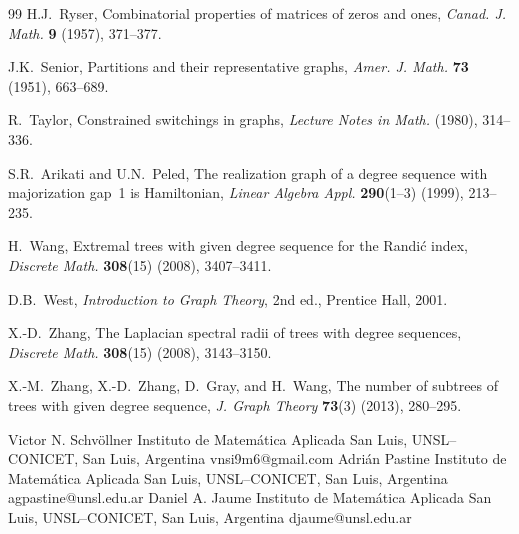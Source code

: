 \documentclass{BICA}
\begin{document}
\begin{thebibliography}{99}
H.J.~Ryser,
  Combinatorial properties of matrices of zeros and ones,
  \textsl{Canad. J. Math.} \textbf{9} (1957), 371--377.

J.K.~Senior,
  Partitions and their representative graphs,
  \textsl{Amer. J. Math.} \textbf{73} (1951), 663--689.

R.~Taylor,
  Constrained switchings in graphs,
  \textsl{Lecture Notes in Math.} (1980), 314--336.

S.R.~Arikati and U.N.~Peled,
  The realization graph of a degree sequence with majorization gap~1 is Hamiltonian,
  \textsl{Linear Algebra Appl.} \textbf{290}(1--3) (1999), 213--235.

H.~Wang,
  Extremal trees with given degree sequence for the Randi\'c index,
  \textsl{Discrete Math.} \textbf{308}(15) (2008), 3407--3411.

D.B.~West,
  \textsl{Introduction to Graph Theory}, 2nd ed.,
  Prentice Hall, 2001.

X.-D.~Zhang,
  The Laplacian spectral radii of trees with degree sequences,
  \textsl{Discrete Math.} \textbf{308}(15) (2008), 3143--3150.

X.-M.~Zhang, X.-D.~Zhang, D.~Gray, and H.~Wang,
  The number of subtrees of trees with given degree sequence,
  \textsl{J. Graph Theory} \textbf{73}(3) (2013), 280--295.

\end{thebibliography}


\begin{Contacts}
\AuthorAddress%
  {Victor N. Schv\"ollner}
  {Instituto de Matem\'atica Aplicada San Luis, UNSL--CONICET, San Luis, Argentina}
  {vnsi9m6@gmail.com}
\AuthorAddress%
  {Adri\'an Pastine}
  {Instituto de Matem\'atica Aplicada San Luis, UNSL--CONICET, San Luis, Argentina}
  {agpastine@unsl.edu.ar}
\AuthorAddress%
  {Daniel A. Jaume}
  {Instituto de Matem\'atica Aplicada San Luis, UNSL--CONICET, San Luis, Argentina}
  {djaume@unsl.edu.ar}
\end{Contacts}
\end{document}
